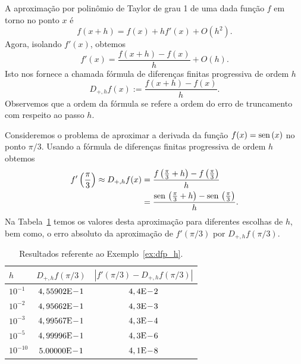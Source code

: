 A aproximação por polinômio de Taylor de grau 1 de uma dada função $f$ em torno no ponto $x$ é
\begin{equation}\label{eq:poli_Taylor_grau_1}
  f(x+h) = f(x) + hf'(x) + O(h^2).
\end{equation}
Agora, isolando $f'(x)$, obtemos
\begin{equation}
  f'(x) = \frac{f(x+h) - f(x)}{h} + O(h).
\end{equation}
Isto nos fornece a chamada fórmula de diferenças finitas progressiva de ordem $h$
\begin{equation}\label{eq:dfp_h}
  D_{+,h}f(x) := \frac{f(x+h) - f(x)}{h}.
\end{equation}
Observemos que a ordem da fórmula se refere a ordem do erro de truncamento com respeito ao passo $h$.

\begin{ex}\label{ex:dfp_h}
  Consideremos o problema de aproximar a derivada da função $f(x) = \operatorname{sen}\,(x)$ no ponto $\pi/3$. Usando a fórmula de diferenças finitas progressiva de ordem $h$ obtemos
  \begin{align}
    f'\left(\frac{\pi}{3}\right) \approx D_{+,h}f(x) &= \frac{f\left(\frac{\pi}{3}+h\right)-f\left(\frac{\pi}{3}\right)}{h}\\
          &= \frac{\operatorname{sen}\,\left(\frac{\pi}{3}+h\right)-\operatorname{sen}\,\left(\frac{\pi}{3}\right)}{h}. 
  \end{align}
Na Tabela~\ref{tab:ex_dfp_h} temos os valores desta aproximação para diferentes escolhas de $h$, bem como, o erro absoluto da aproximação de $f'(\pi/3)$ por $D_{+,h}f(\pi/3)$.

\begin{table}[h!]
  \centering
  \caption{Resultados referente ao Exemplo~\ref{ex:dfp_h}.}
  \begin{tabular}{l|c|c}
    $h$ & $D_{+,h}f(\pi/3)$ & $|f'(\pi/3)-D_{+,h}f(\pi/3)|$\\ \hline
    $10^{-1}$ & $4,55902\mathrm{E}\!-\!1$ & $4,4\mathrm{E}\!-\!2$ \\
    $10^{-2}$ & $4,95662\mathrm{E}\!-\!1$ & $4,3\mathrm{E}\!-\!3$ \\
    $10^{-3}$ & $4,99567\mathrm{E}\!-\!1$ & $4,3\mathrm{E}\!-\!4$ \\
    $10^{-5}$ & $4,99996\mathrm{E}\!-\!1$ & $4,3\mathrm{E}\!-\!6$ \\
    $10^{-10}$ & $5.00000\mathrm{E}\!-\!1$ & $4,1\mathrm{E}\!-\!8$ \\\hline
  \end{tabular}
  \label{tab:ex_dfp_h}
\end{table}
\end{ex}

